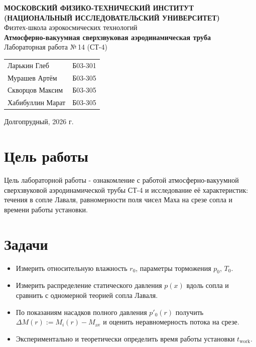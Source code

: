 \documentclass[12pt,a4paper]{article}
\begin{document}
\begin{titlepage}
    \begin{center}
        \textbf{МОСКОВСКИЙ ФИЗИКО-ТЕХНИЧЕСКИЙ ИНСТИТУТ} \\
        \textbf{(НАЦИОНАЛЬНЫЙ ИССЛЕДОВАТЕЛЬСКИЙ УНИВЕРСИТЕТ)}
        \\[1cm]
        {\large Физтех-школа аэрокосмических технологий}
        \\[3.5cm]
        {\Huge \textbf{Атмосферно-вакуумная сверхзвуковая аэродинамическая труба}}
        \\[0.5cm]
        {\large Лабораторная работа №\,14 (СТ-4)}
        \\[1.5cm]
        \begin{flushright}
            \begin{tabular}{l l}
                Ларькин Глеб & Б03-301 \\ 
                Мурашев Артём & Б03-305 \\
                Скворцов Максим & Б03-305 \\
                Хабибуллин Марат & Б03-305 \\
            \end{tabular}
        \end{flushright}
        \vfill
        {\large Долгопрудный, 2026 г.}
    \end{center}
\end{titlepage}

\tableofcontents
\newpage

\section{Цель работы}
Цель лабораторной работы - ознакомление с работой атмосферно-вакуумной
сверхзвуковой аэродинамической трубы СТ-4 и исследование её характеристик:
течения в сопле Лаваля, равномерности поля чисел Маха на срезе сопла и
времени работы установки.

\section{Задачи}
\begin{itemize}
  \item Измерить относительную влажность $r_0$, параметры торможения
        $p_0$, $T_0$.
  \item Измерить распределение статического давления $p(x)$ вдоль сопла
        и сравнить с одномерной теорией сопла Лаваля.
  \item По показаниям насадков полного давления $p'_0(r)$ получить
        $\Delta M(r) := M_i(r) - M_{\mathrm{av}}$ и оценить неравномерность
        потока на срезе.
  \item Экспериментально и теоретически определить время работы установки
        $t_{\mathrm{work}}$.
\end{itemize}
\end{document}

